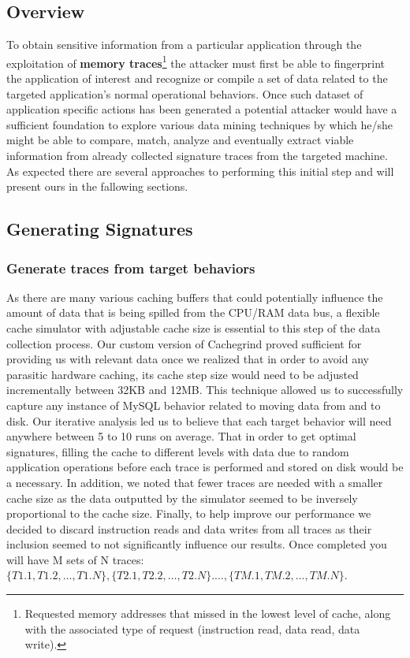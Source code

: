 \documentclass[11pt,a4paper, titlepage, oneside]{article}
\begin{document}
\subsection{Overview}
To obtain sensitive information from a particular application through the exploitation of \textbf{memory traces}\footnote{Requested memory addresses that missed in the lowest level of cache, along with the associated type of request (instruction read, data read, data write).} the attacker must first be able to fingerprint the application of interest and recognize or compile a set of data related to the targeted application's normal operational behaviors. Once such dataset of application specific actions has been generated a potential attacker would have a sufficient foundation to explore various data mining techniques by which he/she might be able to compare, match, analyze and eventually extract viable information from already collected signature traces from the targeted machine. As expected there are several approaches to performing this initial step and will present ours in the fallowing sections.

\subsection{Generating Signatures}
\subsubsection{Generate traces from target behaviors}
As there are many various caching buffers that could potentially influence the amount of data that is being spilled from the CPU/RAM data bus, a flexible cache simulator with adjustable cache size is essential to this step of the data collection process. Our custom version of Cachegrind proved sufficient for providing us with relevant data once we realized that in order to avoid any parasitic hardware caching, its cache step size would need to be adjusted incrementally between 32KB and 12MB. This technique allowed us to successfully capture any instance of MySQL behavior related to moving data from and to disk.  Our iterative analysis led us to believe that each target behavior will need anywhere between 5 to 10 runs on average. That in order to get optimal signatures, filling the cache to different levels with data due to random application operations before each trace is performed and stored on disk would be a necessary. In addition, we noted that fewer traces are needed with a smaller cache size as the data outputted by the simulator seemed to be inversely proportional to the cache size. Finally, to help improve our performance we decided to discard instruction reads and data writes from all traces as their inclusion seemed to not significantly influence our results.
Once completed you will have M sets of N traces: \\$\{T1.1, T1.2, \ldots, T1.N\}, \{T2.1, T2.2, \ldots, T2.N\}. \ldots, \{TM.1, TM.2, \ldots, TM.N\}$.
\end{document}
